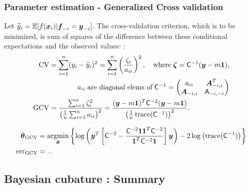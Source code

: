 \documentclass[handout, 10pt,compress,xcolor={usenames,dvipsnames}]{beamer} %
\newcommand{\bm}[1]{\boldsymbol{#1}}
\newcommand{\Ex}{\mathbb{E}}
\newcommand{\GCV}{\textup{GCV}}
\newcommand{\err}{{\text{err}}}
\renewcommand{\ty}{\widetilde{y}}
\renewcommand{\vtheta}{{\bm{\theta}}}
\newcommand{\pause}{}
\begin{document}
\begin{frame}
\frametitle{Parameter estimation - Generalized Cross validation}
\vspace*{-6ex}
Let $\ty_i = \Ex[f(\vx_i ) | \vf_{-i} = \vy_{-i}]$.
The cross-validation criterion, which is to be minimized, is sum of squares of the difference between these conditional expectations and the observed values: :
\vspace*{-2.0ex}
\begin{align*}
\textup{CV} &= \sum_{i=1}^n (y_i - \ty_i)^2 = \sum_{i=1}^n \left(\frac{\zeta_i }{a_{ii}} \right)^2, \quad \text{where}\; \bm{\zeta} = \mC^{-1}(\vy - m \vone), 
\\
& \qquad \qquad a_{ii} \; \text{are diagonal elems of} \; \mC^{-1} = \begin{pmatrix} a_{ii}  & \vA_{-i,i}^T \\  \vA_{-i,i} & \mA_{-i,-i}\end{pmatrix}
\\
\GCV &
= \frac{\sum_{i=1}^n\zeta_i^2}{\left(\frac 1n \sum_{i=1}^n a_{ii} \right)^2} 
= \frac{(\vy - m\vone)^T \mC^{-2} (\vy - m \vone)}{\left(\frac 1n \trace(\mC^{-1}) \right)^2}.
\end{align*}
\pause
\vspace{-2ex}
\begin{align*}
\vtheta_{\GCV} &= \argmin_{\vtheta} \left\{\log \left(  \vy^T \left[\mC^{-2} - \frac{\mC^{-2} \vone \vone^T \mC^{-2}}{\vone^T \mC^{-2} \vone}  \right] \vy \right)  
- 2 \log \left ( \trace(\mC^{-1}) \right ) \right\}
\\
\err_{\GCV} &= ...
\end{align*}
\end{frame}





\iffalse

\subsection{Bayesian cubature : Summary}
\end{document}

